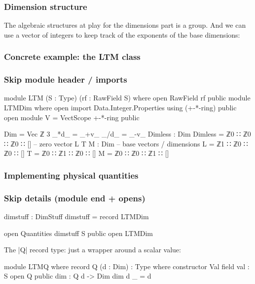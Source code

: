 \documentclass{beamer}
\begin{document}
\begin{frame}
\frametitle{Dimension structure}
The algebraic structures at play for the dimensions part is a group.
And we can use a vector of integers to keep track of the exponents of
the base dimensions:

\frametitle{Concrete example: the LTM class}
\subsubsection{Skip module header / imports}
\begin{code}
module LTM (S : Type) (rf : RawField S) where
  open RawField rf public
  module LTMDim where
    open import Data.Integer.Properties using (+-*-ring) public
    open module V = VectScope +-*-ring public
\end{code}

\begin{code}
    Dim = Vec ℤ 3
    _*d_ = _+v_
    _/d_ = _-v_
    Dimless  : Dim
    Dimless  = ℤ0 ∷ ℤ0 ∷ ℤ0 ∷ [] -- zero vector
    L T M    : Dim -- base vectors / dimensions
    L        = ℤ1 ∷ ℤ0 ∷ ℤ0 ∷ []
    T        = ℤ0 ∷ ℤ1 ∷ ℤ0 ∷ []
    M        = ℤ0 ∷ ℤ0 ∷ ℤ1 ∷ []
\end{code}
\end{frame}
\begin{frame}
\frametitle{Implementing physical quantities}
\subsubsection{Skip details (module end + opens)}
\begin{code}
  dimstuff : DimStuff
  dimstuff = record { LTMDim }

  open Quantities dimstuff S public
  open LTMDim
\end{code}
The |Q| record type: just a wrapper around a scalar value:
\begin{code}
  module LTMQ where
    record Q (d : Dim) : Type where
      constructor Val
      field
        val : S
    open Q public
    dim : Q d -> Dim
    dim {d} _ = d
\end{code}
\end{frame}
\end{document}
